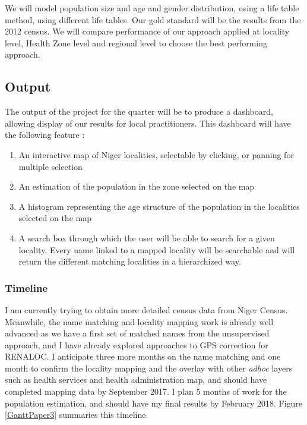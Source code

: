 We will model population size and age and gender distribution, using a life table method, using different life tables. Our gold standard will be the results from the 2012 census. We will compare performance of our approach applied at locality level, Health Zone level and regional level to choose the best performing approach.


\subsection{Output}

The output of the project for the quarter will  be to produce a dashboard, allowing display of our results for local practitioners. This dashboard will have the following feature :
\begin{enumerate}
	\item An interactive map of Niger localities, selectable by clicking, or panning for multiple selection
	\item An estimation of the population in the zone selected on the map
	\item A histogram representing the age structure of the population in the localities selected on the map
	\item A search box through which the user will be able to search for a given locality. Every name linked to a mapped locality will be searchable and will return the different matching localities in a hierarchized way.
\end{enumerate}



\subsubsection{Timeline}
\label{timeline:aim3}
I am currently trying to obtain more detailed census data from Niger Census. Meanwhile, the name matching and locality mapping work is already well advanced as we have a first set of matched names from the unsupervised approach, and I have already explored approaches to GPS correction for RENALOC. I anticipate three more months on the name matching and one month to confirm the locality mapping and the overlay with other \textit{adhoc} layers such as health services and health administration map, and should have completed mapping data by September 2017. I plan 5 months of work for the population estimation, and should have my final results by February 2018. Figure \ref{GanttPaper3} summaries this timeline.

